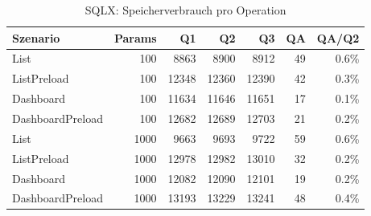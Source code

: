 \begin{table}[ht]
\centering
\caption{SQLX: Speicherverbrauch pro Operation}
\begin{tabular}{lrrrrrr}
\toprule
Szenario & Params & Q1 & Q2 & Q3 & QA & QA/Q2 \\
\midrule
		List & 100 & 8863 & 8900 & 8912 & 49 & 0.6\% \\
		ListPreload & 100 & 12348 & 12360 & 12390 & 42 & 0.3\% \\
		Dashboard & 100 & 11634 & 11646 & 11651 & 17 & 0.1\% \\
		DashboardPreload & 100 & 12682 & 12689 & 12703 & 21 & 0.2\% \\
		List & 1000 & 9663 & 9693 & 9722 & 59 & 0.6\% \\
		ListPreload & 1000 & 12978 & 12982 & 13010 & 32 & 0.2\% \\
		Dashboard & 1000 & 12082 & 12090 & 12101 & 19 & 0.2\% \\
		DashboardPreload & 1000 & 13193 & 13229 & 13241 & 48 & 0.4\% \\
\bottomrule
\end{tabular}
\label{tab:benchmark_sqlx_bytesperop}
\end{table}
	